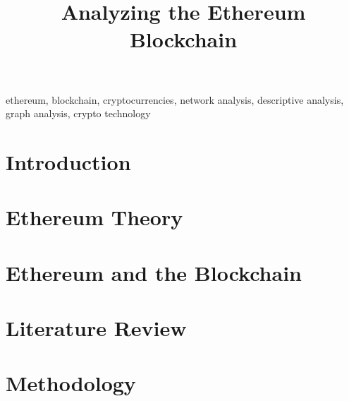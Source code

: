 \documentclass[conference]{IEEEtran}
\begin{document}
\title{Analyzing the Ethereum Blockchain}


\author{
\and
{}
\and
{}
}


\maketitle

\begin{abstract}

\end{abstract}


\begin{IEEEkeywords}
ethereum, blockchain, cryptocurrencies, network analysis, descriptive analysis, graph analysis, crypto technology
\end{IEEEkeywords}

\section{Introduction}
\label{introduction}


\section{Ethereum Theory}
\label{ethereum-theory}


\section{Ethereum and the Blockchain}
\label{ethereum-blockchain}


\section{Literature Review}
\label{literature-review}


\section{Methodology}
\label{methods}
\end{document}
